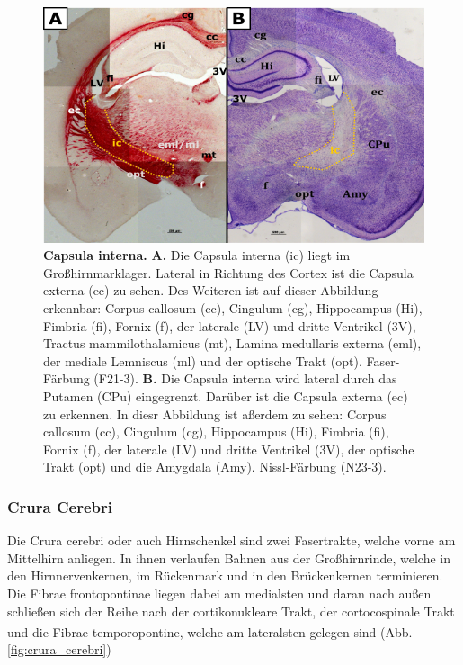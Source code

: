 \documentclass[12pt,a4paper,pdftex]{article}
\begin{document}
\begin{figure}[H]
    \centering
    \includegraphics[width=\textwidth]{pictures/Bilder_Laura/internal_capsule_F21_3P_025x_N23_3P_025x.png}
    \caption[Capsula interna]{\textbf{Capsula interna.} \textbf{A.} Die Capsula interna (ic) liegt im Großhirnmarklager. Lateral in Richtung des Cortex ist die Capsula externa (ec) zu sehen. Des Weiteren ist auf dieser Abbildung erkennbar: Corpus callosum (cc), Cingulum (cg), Hippocampus (Hi), Fimbria (fi), Fornix (f), der laterale (LV) und dritte Ventrikel (3V), Tractus mammilothalamicus (mt), Lamina medullaris externa (eml), der mediale Lemniscus (ml) und der optische Trakt (opt). Faser-Färbung (F21-3). \textbf{B.} Die Capsula interna wird lateral durch das Putamen (CPu) eingegrenzt. Darüber ist die Capsula externa (ec) zu erkennen. In diesr Abbildung ist aßerdem zu sehen: Corpus callosum (cc), Cingulum (cg), Hippocampus (Hi), Fimbria (fi), Fornix (f), der laterale (LV) und dritte Ventrikel (3V), der optische Trakt (opt) und die Amygdala (Amy). Nissl-Färbung (N23-3).}
    \label{fig:Capsula_interna}
\end{figure}


\subsubsection*{Crura Cerebri} 
Die Crura cerebri oder auch Hirnschenkel sind zwei Fasertrakte, welche vorne am Mittelhirn anliegen. In ihnen verlaufen Bahnen aus der Großhirnrinde, welche in den Hirnnervenkernen, im Rückenmark und in den Brückenkernen terminieren. Die Fibrae frontopontinae liegen dabei am medialsten und daran nach außen schließen sich der Reihe nach der cortikonukleare Trakt, der cortocospinale Trakt und die Fibrae temporopontine, welche am lateralsten gelegen sind \textsuperscript{\cite[6]{trepel2011neuroanatomie}} (Abb. \ref{fig:crura_cerebri})
\end{document}
